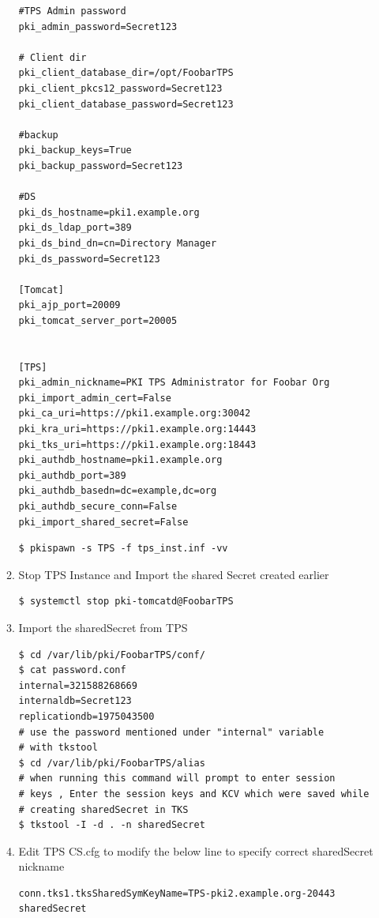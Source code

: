 \documentclass[12pt]{report}
\begin{document}
\begin{enumerate}[label*=\arabic*.]
\begin{enumerate}[label*=\arabic*.]
\begin{lstlisting}[style=configFile]
#TPS Admin password
pki_admin_password=Secret123

# Client dir
pki_client_database_dir=/opt/FoobarTPS
pki_client_pkcs12_password=Secret123
pki_client_database_password=Secret123

#backup
pki_backup_keys=True
pki_backup_password=Secret123

#DS
pki_ds_hostname=pki1.example.org
pki_ds_ldap_port=389
pki_ds_bind_dn=cn=Directory Manager
pki_ds_password=Secret123

[Tomcat]
pki_ajp_port=20009
pki_tomcat_server_port=20005


[TPS]
pki_admin_nickname=PKI TPS Administrator for Foobar Org
pki_import_admin_cert=False
pki_ca_uri=https://pki1.example.org:30042
pki_kra_uri=https://pki1.example.org:14443
pki_tks_uri=https://pki1.example.org:18443
pki_authdb_hostname=pki1.example.org
pki_authdb_port=389
pki_authdb_basedn=dc=example,dc=org
pki_authdb_secure_conn=False
pki_import_shared_secret=False
            \end{lstlisting}            
            \begin{lstlisting}[style=bashInputStyle]
$ pkispawn -s TPS -f tps_inst.inf -vv
            \end{lstlisting}
        \item Stop TPS Instance and Import the shared Secret created earlier 
            \begin{lstlisting}[style=bashInputStyle]
$ systemctl stop pki-tomcatd@FoobarTPS            
            \end{lstlisting}
        \item Import the sharedSecret from TPS
            \begin{lstlisting}[style=bashInputStyle]
$ cd /var/lib/pki/FoobarTPS/conf/
$ cat password.conf
internal=321588268669
internaldb=Secret123
replicationdb=1975043500
# use the password mentioned under "internal" variable 
# with tkstool
$ cd /var/lib/pki/FoobarTPS/alias
# when running this command will prompt to enter session
# keys , Enter the session keys and KCV which were saved while 
# creating sharedSecret in TKS
$ tkstool -I -d . -n sharedSecret
            \end{lstlisting}
        \item Edit TPS CS.cfg to modify the below line to specify correct sharedSecret nickname
            \begin{lstlisting}
conn.tks1.tksSharedSymKeyName=TPS-pki2.example.org-20443 sharedSecret                
            \end{lstlisting}

\end{enumerate}
\end{enumerate}
\end{document}
